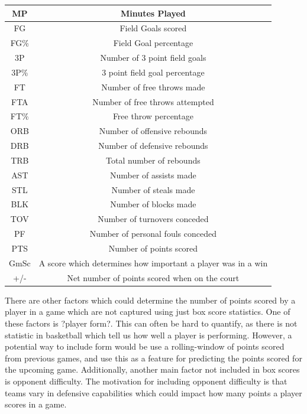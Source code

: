 \documentclass[a4paper,11pt,twoside]{article}
\begin{document}
\vspace{5mm}
\begin{center}
\begin{tabular}{ |c|c| } 
 \hline
MP & Minutes Played  \\ 
 \hline
FG & Field Goals scored \\ 
 \hline
FG\% & Field Goal percentage\\ 
 \hline
3P & Number of 3 point field goals\\
 \hline
 3P\% & 3 point field goal percentage\\
\hline
FT & Number of free throws made\\
\hline
FTA & Number of free throws attempted\\
\hline
FT\% & Free throw percentage\\
\hline
ORB & Number of offensive rebounds\\
\hline
DRB & Number of defensive rebounds\\
\hline
TRB & Total number of rebounds\\
\hline
AST & Number of assists made\\
\hline
STL & Number of steals made\\
\hline
BLK & Number of blocks made\\
\hline
TOV & Number of turnovers conceded\\
\hline
PF & Number of personal fouls conceded\\
\hline
PTS & Number of points scored\\
\hline
GmSc & A score which determines how important a player was in a win\\
\hline
+/- & Net number of points scored when on the court\\
\hline
\end{tabular}
\end{center}
\vspace{5mm}


There are other factors which could determine the number of points scored by a player in a game which are not captured using just box score statistics. One of these factors is ?player form?. This can often be hard to quantify, as there is not statistic in basketball which tell us how well a player is performing.  However, a potential way to include form would be use a rolling-window of points scored from previous games, and use this as a feature for predicting the points scored for the upcoming game.  Additionally, another main factor not included in box scores is opponent difficulty. The motivation for including opponent difficulty is that teams vary in defensive capabilities which could impact how many points a player scores in a game.
\end{document}
